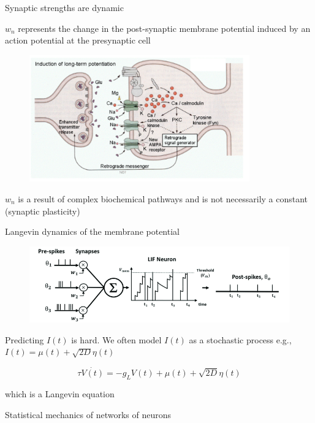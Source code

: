 \documentclass[aspectratio=169]{beamer}
\begin{document}
\begin{frame}{Synaptic strengths are dynamic}

$w_{n}$ represents the change in the post-synaptic membrane potential induced by an action potential at the presynaptic cell

\begin{figure}
\centering
\includegraphics[width=95mm]{figure-12}
\end{figure}

$w_{n}$ is a result of complex biochemical pathways and is not necessarily a constant (synaptic plasticity)

\end{frame}

\begin{frame}{Langevin dynamics of the membrane potential}

\begin{figure}
\centering
\includegraphics[width=125mm]{figure-14}
\end{figure}

Predicting $I(t)$ is hard. We often model $I(t)$ as a stochastic process e.g., $I(t) = \mu(t) + \sqrt{2D}\eta(t)$

\begin{equation*}
\tau\dot{V(t)} = -g_{L}V(t) + \mu(t) + \sqrt{2D}\eta(t)
\end{equation*}

which is a Langevin equation

\end{frame}

\begin{frame}{Statistical mechanics of networks of neurons}

\end{frame}
\end{document}
